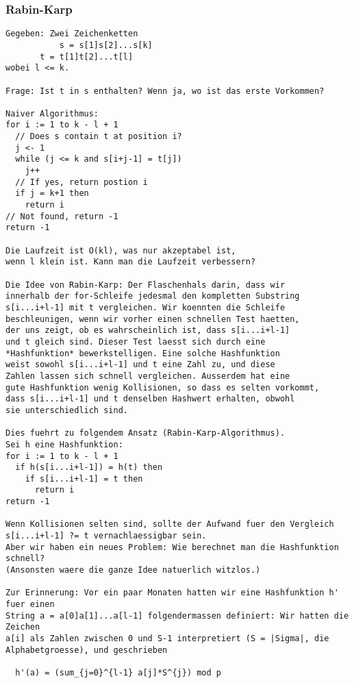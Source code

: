\subsubsection{Rabin-Karp}
\label{subsubsection:RabinKarp}

\begin{verbatim}
Gegeben: Zwei Zeichenketten
           s = s[1]s[2]...s[k]
	   t = t[1]t[2]...t[l]
wobei l <= k.

Frage: Ist t in s enthalten? Wenn ja, wo ist das erste Vorkommen?

Naiver Algorithmus:
for i := 1 to k - l + 1
  // Does s contain t at position i?
  j <- 1
  while (j <= k and s[i+j-1] = t[j])
    j++
  // If yes, return postion i
  if j = k+1 then
    return i
// Not found, return -1
return -1

Die Laufzeit ist O(kl), was nur akzeptabel ist,  
wenn l klein ist. Kann man die Laufzeit verbessern?

Die Idee von Rabin-Karp: Der Flaschenhals darin, dass wir
innerhalb der for-Schleife jedesmal den kompletten Substring
s[i...i+l-1] mit t vergleichen. Wir koennten die Schleife
beschleunigen, wenn wir vorher einen schnellen Test haetten,
der uns zeigt, ob es wahrscheinlich ist, dass s[i...i+l-1]
und t gleich sind. Dieser Test laesst sich durch eine 
*Hashfunktion* bewerkstelligen. Eine solche Hashfunktion
weist sowohl s[i...i+l-1] und t eine Zahl zu, und diese
Zahlen lassen sich schnell vergleichen. Ausserdem hat eine
gute Hashfunktion wenig Kollisionen, so dass es selten vorkommt,
dass s[i...i+l-1] und t denselben Hashwert erhalten, obwohl
sie unterschiedlich sind.

Dies fuehrt zu folgendem Ansatz (Rabin-Karp-Algorithmus).
Sei h eine Hashfunktion:
for i := 1 to k - l + 1
  if h(s[i...i+l-1]) = h(t) then
    if s[i...i+l-1] = t then
      return i
return -1

Wenn Kollisionen selten sind, sollte der Aufwand fuer den Vergleich
s[i...i+l-1] ?= t vernachlaessigbar sein.
Aber wir haben ein neues Problem: Wie berechnet man die Hashfunktion schnell?
(Ansonsten waere die ganze Idee natuerlich witzlos.)

Zur Erinnerung: Vor ein paar Monaten hatten wir eine Hashfunktion h' fuer einen 
String a = a[0]a[1]...a[l-1] folgendermassen definiert: Wir hatten die Zeichen 
a[i] als Zahlen zwischen 0 und S-1 interpretiert (S = |Sigma|, die 
Alphabetgroesse), und geschrieben
  
  h'(a) = (sum_{j=0}^{l-1} a[j]*S^{j}) mod p


\end{verbatim}
